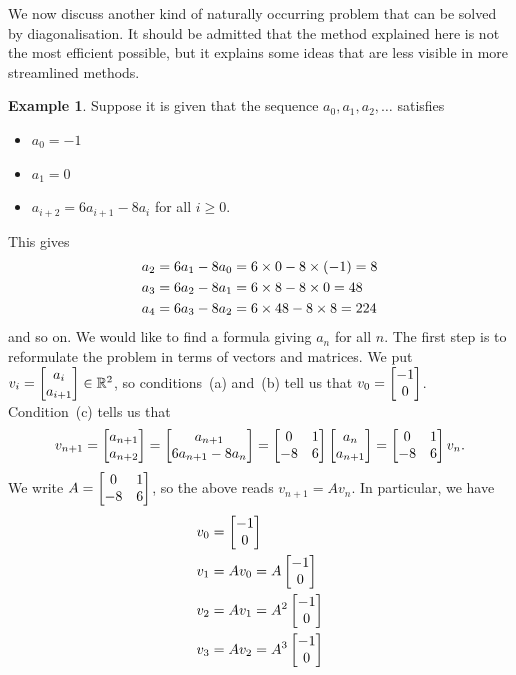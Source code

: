 \documentclass[reqno]{amsart}
\theoremstyle{definition}
\newtheorem{example}[theorem]{Example}
\begin{document}
We now discuss another kind of naturally occurring problem that can be
solved by diagonalisation.  It should be admitted that the method
explained here is not the most efficient possible, but it explains
some ideas that are less visible in more streamlined methods.

\begin{example}\label{eg-difference-i}
 Suppose it is given that the sequence $a_0,a_1,a_2,\dotsc$ satisfies
 \begin{itemize}
  \item[(a)] $a_0=-1$
  \item[(b)] $a_1=0$
  \item[(c)] $a_{i+2}=6a_{i+1}-8a_i$ for all $i\geq 0$.
 \end{itemize}
 This gives
 \begin{align*}
  a_2 &= 6a_1 - 8a_0 = 6\times 0 - 8\times(-1) = 8 \\
  a_3 &= 6a_2 - 8a_1 = 6\times 8 - 8\times 0 = 48 \\
  a_4 &= 6a_3 - 8a_2 = 6\times 48 - 8\times 8 = 224
 \end{align*}
 and so on.  We would like to find a formula giving $a_n$ for all
 $n$.  The first step is to reformulate the problem in terms of
 vectors and matrices.  We put $v_i=\left[\begin{matrix} a_i\\ a_{i+1}\end{matrix}\right]\in{\mathbb{R}}^2$, so
 conditions~(a) and~(b) tell us that $v_0=\left[\begin{matrix} -1\\ 0\end{matrix}\right]$.
 Condition~(c) tells us that
 \[ v_{n+1} =
     \left[\begin{matrix} a_{n+1} \\ a_{n+2} \end{matrix}\right] =
     \left[\begin{matrix} a_{n+1} \\ 6a_{n+1}-8a_n \end{matrix}\right] =
     \left[\begin{matrix} 0 & 1 \\ -8 & 6 \end{matrix}\right]\left[\begin{matrix} a_n \\ a_{n+1}\end{matrix}\right] =
     \left[\begin{matrix} 0 & 1 \\ -8 & 6 \end{matrix}\right] v_n.
 \]
 We write $A=\left[\begin{matrix} 0&1 \\ -8&6\end{matrix}\right]$, so the above reads $v_{n+1}=Av_n$.
 In particular, we have
 \begin{align*}
  v_0 &= \bbm -1 \\ 0 \ebm \\
  v_1 &= Av_0 = A\bbm -1 \\ 0 \ebm \\
  v_2 &= Av_1 = A^2\bbm -1 \\ 0 \ebm \\
  v_3 &= Av_2 = A^3\bbm -1 \\ 0 \ebm

\end{align*}
\end{example}
\end{document}
